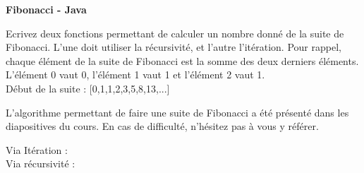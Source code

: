     \begin{Exercice}[15 minutes] \textbf{Fibonacci - Java} 

Ecrivez deux fonctions permettant de calculer un nombre donné de la suite de Fibonacci. L'une doit utiliser la récursivité, et l'autre l'itération. Pour rappel, chaque élément de la suite de Fibonacci est la somme des deux derniers éléments. L'élément 0 vaut 0, l'élément 1 vaut 1 et l'élément 2 vaut 1. \\

Début de la suite : [0,1,1,2,3,5,8,13,...]
    

    \begin{conseil} 
        L'algorithme permettant de faire une suite de Fibonacci a été présenté dans les diapositives du cours. En cas de difficulté, n'hésitez pas à vous y référer.
    \end{conseil} 

    \begin{solution}
        Via Itération : \\
        
             
            
        Via récursivité : \\
        
            
    \end{solution} 

    \end{Exercice}


